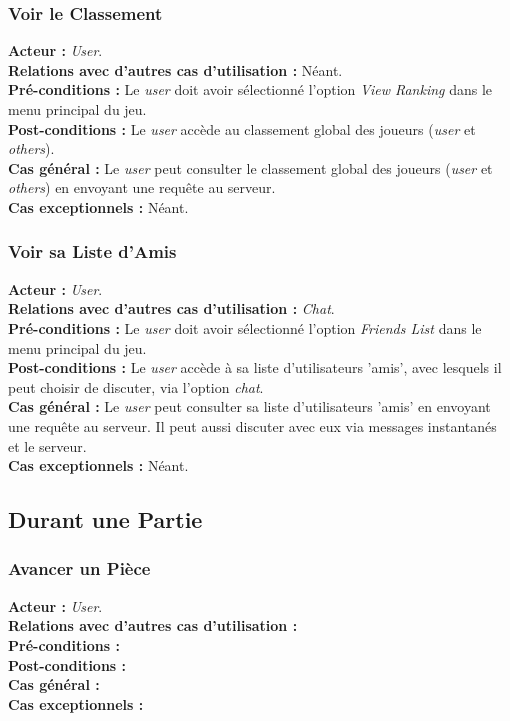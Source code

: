\documentclass[10pt, a4paper]{article}
\begin{document}
\subsubsection{Voir le Classement}
\textbf{Acteur :} \textit{User}.\\
\textbf{Relations avec d'autres cas d'utilisation :} Néant.\\
\textbf{Pré-conditions :} Le \textit{user} doit avoir sélectionné l'option \textit{View Ranking} dans le menu principal du jeu.\\
\textbf{Post-conditions :} Le \textit{user} accède au classement global des joueurs (\textit{user} et \textit{others}).\\
\textbf{Cas général :} Le \textit{user} peut consulter le classement global des joueurs (\textit{user} et \textit{others}) en envoyant une requête au serveur.\\
\textbf{Cas exceptionnels :} Néant.

\subsubsection{Voir sa Liste d'Amis}
\textbf{Acteur :} \textit{User}.\\
\textbf{Relations avec d'autres cas d'utilisation :} \textit{Chat}.\\
\textbf{Pré-conditions :} Le \textit{user} doit avoir sélectionné l'option \textit{Friends List} dans le menu principal du jeu.\\
\textbf{Post-conditions :} Le \textit{user} accède à sa liste d'utilisateurs 'amis', avec lesquels il peut choisir de discuter, via l'option \textit{chat}.\\
\textbf{Cas général :} Le \textit{user} peut consulter sa liste d'utilisateurs 'amis' en envoyant une requête au serveur. Il peut aussi discuter avec eux via messages instantanés et le serveur.\\
\textbf{Cas exceptionnels :} Néant.
		

\subsection{Durant une Partie}

\subsubsection{Avancer un Pièce}
\textbf{Acteur :} \textit{User}.\\
\textbf{Relations avec d'autres cas d'utilisation :}\\ %
\textbf{Pré-conditions :}\\ %
\textbf{Post-conditions :}\\ %
\textbf{Cas général :}\\ %
\textbf{Cas exceptionnels :}\\ %
\end{document}
